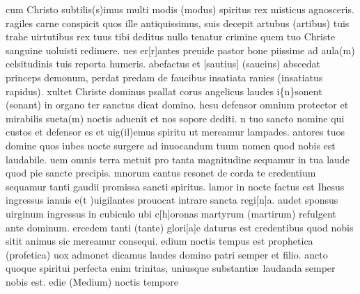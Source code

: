 \documentclass[letter,12pt]{book}
\begin{document}
cum Christo subtilis(s)imus
multi modis (modus) spiritus rex
misticus agnosceris.
ragiles carne conspicit
quos ille antiquissimus,
suis decepit artubus (artibus)
tuis trahe uirtutibus
rex tuus tibi deditus
nullo tenatur crimine
quem tuo Christe sanguine
uoluisti redimere.
ues er[r]antes preuide
pastor bone piissime
ad aula(m) celsitudinis
tuis reporta humeris.
abefactus et [sautius] (saucius)
abscedat princeps demonum,
perdat predam de faucibus
insatiata rauies (insatiatus rapidus).
xultet Christe dominus
psallat corus angelicus
laudes i\{n\}sonent (sonant) in organo
ter sanctus dicat domino.
hesu defensor omnium
protector et mirabilis
sueta(m) noctis aduenit
et nos sopore dediti.
n tuo sancto nomine
qui custos et defensor es
et uig(il)emus spiritu
ut mereamur lampades.
antores tuos domine
quos iubes nocte surgere
ad inuocandum tuum nomen
quod nobis est laudabile.
uem omnis terra metuit
pro tanta magnitudine
sequamur in tua laude
quod pie sancte precipis.
mnorum cantus resonet
de corda te credentium
sequamur tanti gaudii
promissa sancti spiritus.
lamor in nocte factus est
Ihesus ingressus ianuis
e(t )uigilantes prouocat
intrare sancta regi[n]a.
audet sponsus uirginum
ingressus in cubiculo
ubi c[h]oronas martyrum (martirum)
refulgent ante dominum.
ercedem tanti (tante) glori[a]e
daturus est
credentibus
quod nobis sitit animus
sic mereamur consequi. %
edium noctis tempus est
prophetica (profetica) uox admonet
dicamus laudes domino
patri semper et filio.
ancto quoque spiritui
perfecta enim trinitas,
uniusque substanti\ae \ 
laudanda semper nobis est.
edie (Medium) noctis tempore
\end{document}
